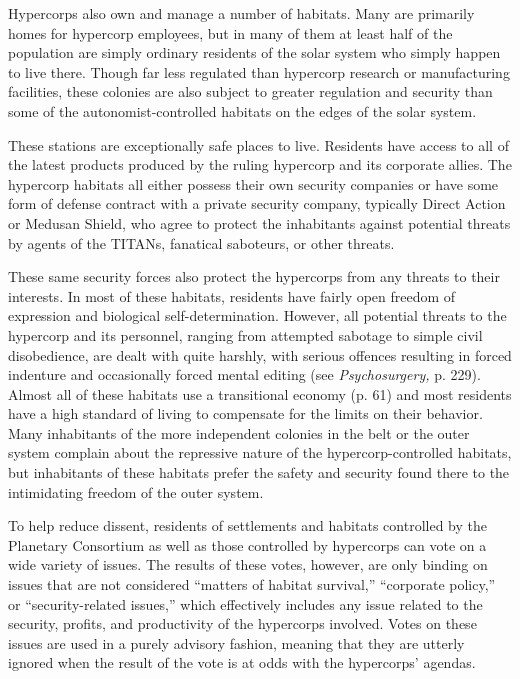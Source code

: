 Hypercorps also own and manage a number of 
habitats. Many are primarily homes for hypercorp 
employees, but in many of them at least half of the 
population are simply ordinary residents of the solar 
system who simply happen to live there. Though far 
less regulated than hypercorp research or manufacturing
facilities, these colonies are also subject to
greater regulation and security than some of the 
autonomist-controlled habitats on the edges of the 
solar system. 

These stations are exceptionally safe places to live. 
Residents have access to all of the latest products 
produced by the ruling hypercorp and its corporate 
allies. The hypercorp habitats all either possess 
their own security companies or have some form 
of defense contract with a private security company, 
typically Direct Action or Medusan Shield, who 
agree to protect the inhabitants against potential 
threats by agents of the TITANs, fanatical saboteurs, 
or other threats.

These same security forces also protect the hypercorps
from any threats to their interests. In most of
these habitats, residents have fairly open freedom 
of expression and biological self-determination. 
However, all potential threats to the hypercorp and 
its personnel, ranging from attempted sabotage 
to simple civil disobedience, are dealt with quite 
harshly, with serious offences resulting in forced indenture
and occasionally forced mental editing (see
\textit{Psychosurgery, }p. 229). Almost all of these habitats 
use a transitional economy (p. 61) and most residents 
have a high standard of living to compensate for the 
limits on their behavior. Many inhabitants of the 
more independent colonies in the belt or the outer 
system complain about the repressive nature of the 
hypercorp-controlled habitats, but inhabitants of 
these habitats prefer the safety and security found 
there to the intimidating freedom of the outer system.

To help reduce dissent, residents of settlements and 
habitats controlled by the Planetary Consortium as 
well as those controlled by hypercorps can vote on 
a wide variety of issues. The results of these votes, 
however, are only binding on issues that are not 
considered ``matters of habitat survival,'' ``corporate 
policy,'' or ``security-related issues,'' which effectively 
includes any issue related to the security, profits, and 
productivity of the hypercorps involved. Votes on 
these issues are used in a purely advisory fashion, 
meaning that they are utterly ignored when the result 
of the vote is at odds with the hypercorps' agendas.

